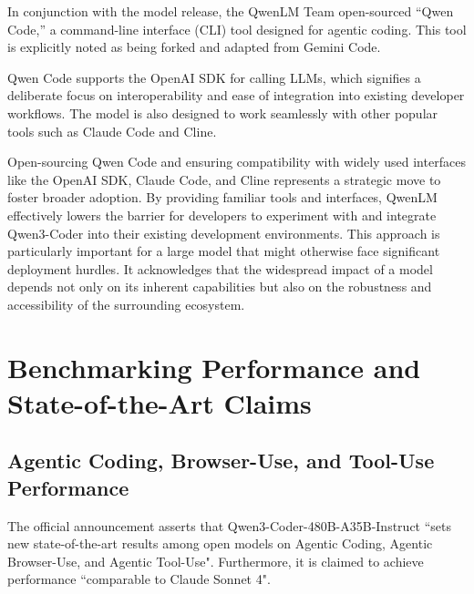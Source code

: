In conjunction with the model release, the QwenLM Team open-sourced ``Qwen Code,'' a command-line interface (CLI) tool designed for agentic coding. This tool is explicitly noted as being forked and adapted from Gemini Code.\cite{fortuneindia_qwen3coder_2025, qwenlm_qwen3coder_blog_2025, marktechpost_qwen3coder_2025, youtube_qwen3coder_leading_2025, willison_qwen3coder_2025, github_qwenlm_qwencode_2025}

Qwen Code supports the OpenAI SDK for calling LLMs, which signifies a deliberate focus on interoperability and ease of integration into existing developer workflows.\cite{qwenlm_qwen3coder_blog_2025, github_qwenlm_qwencode_2025} The model is also designed to work seamlessly with other popular tools such as Claude Code and Cline.\cite{fortuneindia_qwen3coder_2025, qwenlm_qwen3coder_blog_2025, ainvest_qwen3coder_2025, marktechpost_qwen3coder_2025, youtube_qwen3coder_leading_2025, willison_qwen3coder_2025}

Open-sourcing Qwen Code and ensuring compatibility with widely used interfaces like the OpenAI SDK, Claude Code, and Cline represents a strategic move to foster broader adoption.\cite{fortuneindia_qwen3coder_2025, qwenlm_qwen3coder_blog_2025, ainvest_qwen3coder_2025, marktechpost_qwen3coder_2025, youtube_qwen3coder_leading_2025, willison_qwen3coder_2025, github_qwenlm_qwencode_2025} By providing familiar tools and interfaces, QwenLM effectively lowers the barrier for developers to experiment with and integrate Qwen3-Coder into their existing development environments. This approach is particularly important for a large model that might otherwise face significant deployment hurdles. It acknowledges that the widespread impact of a model depends not only on its inherent capabilities but also on the robustness and accessibility of the surrounding ecosystem.

\section{Benchmarking Performance and State-of-the-Art Claims}

\subsection{Agentic Coding, Browser-Use, and Tool-Use Performance}

The official announcement asserts that Qwen3-Coder-480B-A35B-Instruct ``sets new state-of-the-art results among open models on Agentic Coding, Agentic Browser-Use, and Agentic Tool-Use".\cite{qwenlm_qwen3coder_blog_2025, gupta_qwen3coder_medium_2025, ainvest_qwen3coder_2025, github_qwenlm_qwen3coder_2025, reddit_localllama_qwen3coder_2_2025, investing_qwen3coder_2025, reddit_localllama_qwen3coder_3_2025, marktechpost_qwen3coder_2025, youtube_qwen3coder_leading_2025, willison_qwen3coder_2025} Furthermore, it is claimed to achieve performance ``comparable to Claude Sonnet 4".\cite{qwenlm_qwen3coder_blog_2025, llmstats_claude_qwen3_2025, gupta_qwen3coder_medium_2025, ainvest_qwen3coder_2025, github_qwenlm_qwen3coder_2025, reddit_localllama_qwen3coder_2_2025, investing_qwen3coder_2025, reddit_localllama_qwen3coder_3_2025, marktechpost_qwen3coder_2025, youtube_qwen3coder_leading_2025, willison_qwen3coder_2025}

